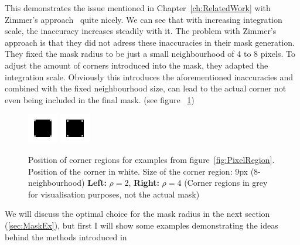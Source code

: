 This demonstrates the issue mentioned in Chapter~\ref{ch:RelatedWork} with Zimmer's approach~\cite{zimmer07} quite nicely. 
We can see that with increasing integration scale, the inaccuracy increases
steadily with it. The problem with Zimmer's approach is that they did not adress these inaccuracies in
their mask generation. They fixed the mask radius to be just a small neighbourhood of 4 to 8 pixels.
To adjust the amount of corners introduced into the mask, they adapted the integration scale.
Obviously this introduces the aforementioned inaccuracies and combined with the fixed neighbourhood
size, can lead to the actual corner not even being included in the final mask. (see figure
~\ref{fig:Inacc})

\begin{figure}[h]
    \centering
    \includegraphics[width=0.4\linewidth]{../Images/rect/rect_2_mask_position.png}
    \includegraphics[width=0.4\linewidth]{../Images/rect/rect_4_mask_position.png}
    \caption{Position of corner regions for examples from figure~\ref{fig:PixelRegion}.
        Position of the corner in white. Size of the corner region: 9px (8-neighbourhood)
    \textbf{Left:} $\rho=2$, \textbf{Right:} $\rho=4$ (Corner regions in grey for visualisation
purposes, not the actual mask)}\label{fig:Inacc}
\end{figure}
We will discuss the optimal choice for the mask radius in the next section (\ref{sec:MaskEx}), but
first I will show some examples demonstrating the ideas behind the methods introduced in
